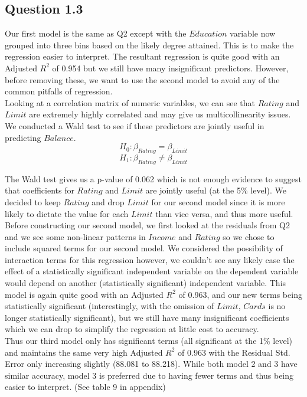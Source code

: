 \documentclass[11pt]{article}
\begin{document}
{\subsection*{Question 1.3}
Our first model is the same as Q2 except with the $Education$ variable now grouped into three bins based on the likely degree attained. This is to make the regression easier to interpret. The resultant regression is quite good with an Adjusted $R^2$ of 0.954 but we still have many insignificant predictors. However, before removing these, we want to use the second model to avoid any of the common pitfalls of regression.\\

Looking at a correlation matrix of numeric variables, we can see that $Rating$ and $Limit$ are extremely highly correlated and may give us multicollinearity issues. We conducted a Wald test to see if these predictors are jointly useful in predicting $Balance$. 
$$H_0: \beta_{Rating} = \beta_{Limit}$$
$$H_1: \beta_{Rating} \neq \beta_{Limit}$$

The Wald test gives us a p-value of 0.062 which is not enough evidence to suggest that coefficients for $Rating$ and $Limit$ are jointly useful (at the 5\% level). We decided to keep $Rating$ and drop $Limit$ for our second model since it is more likely to dictate the value for each $Limit$ than vice versa, and thus more useful.\\

Before constructing our second model, we first looked at the residuals from Q2 and we see some non-linear patterns in $Income$ and $Rating$ so we chose to include squared terms for our second model. We considered the possibility of interaction terms for this regression however, we couldn't see any likely case the effect of a statistically significant independent variable on the dependent variable would depend on another (statistically significant) independent variable. This model is again quite good with an Adjusted $R^2$ of 0.963, and our new terms being statistically significant (interestingly, with the omission of $Limit$, $Cards$ is no longer statistically significant), but we still have many insignificant coefficients which we can drop to simplify the regression at little cost to accuracy.\\

Thus our third model only has significant terms (all significant at the 1\% level) and maintains the same very high Adjusted $R^2$ of 0.963 with the Residual Std. Error only increasing slightly (88.081 to 88.218). While both model 2 and 3 have similar accuracy, model 3 is preferred due to having fewer terms and thus being easier to interpret. (See table 9 in appendix)\\

}
\end{document}
